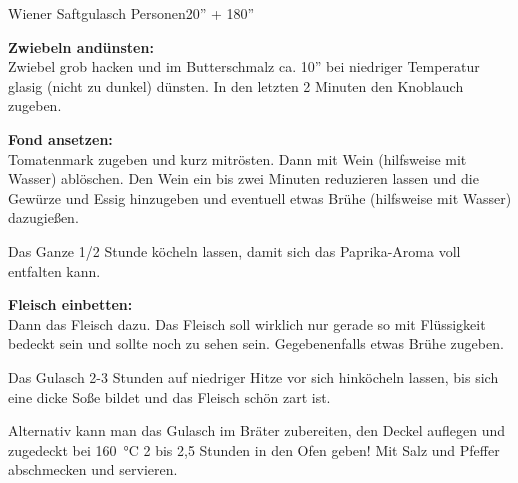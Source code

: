 \begin{MyRecipe}{Wiener Saftgulasch}{ Personen}{20'' + 180''}


\textbf{Zwiebeln andünsten:}\\
Zwiebel grob hacken und im Butterschmalz ca. 10'' bei niedriger Temperatur glasig (nicht zu dunkel) dünsten. In den letzten 2 Minuten den Knoblauch zugeben.\par\bigskip	

\textbf{Fond ansetzen:}\\
Tomatenmark zugeben und kurz mitrösten. Dann mit Wein (hilfsweise mit Wasser) ablöschen. Den Wein ein bis zwei Minuten reduzieren lassen und die Gewürze und Essig hinzugeben und eventuell etwas Brühe (hilfsweise mit Wasser) dazugießen.\par
Das Ganze 1/2 Stunde köcheln lassen, damit sich das Paprika-Aroma voll entfalten kann.\par\bigskip	

\textbf{Fleisch einbetten:}\\
Dann das Fleisch dazu. Das Fleisch soll wirklich nur gerade so mit Flüssigkeit bedeckt sein und sollte noch zu sehen sein. Gegebenenfalls etwas Brühe zugeben.\par
Das Gulasch 2-3 Stunden auf niedriger Hitze vor sich hinköcheln lassen, bis sich eine dicke Soße bildet und das Fleisch schön zart ist.\par
Alternativ kann man das Gulasch im Bräter zubereiten, den Deckel auflegen und zugedeckt bei \SI{160}{\degreeCelsius} 2 bis 2,5 Stunden in den Ofen geben! Mit Salz und Pfeffer abschmecken und servieren.\par\bigskip	
		
\end{MyRecipe}